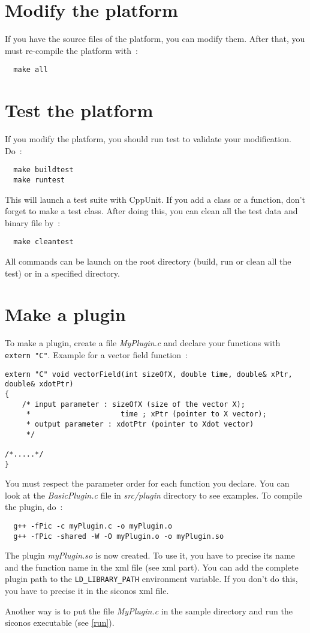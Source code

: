 \section{Modify the platform}
If you have the source files of the platform, you can modify them.
After that, you must re-compile the platform with~:
\begin{verbatim}
  make all
\end{verbatim}

\section{Test the platform} 
If you modify the platform, you should run test to validate your modification. Do~:
\begin{verbatim}
  make buildtest
  make runtest
\end{verbatim}

This will launch a test suite with CppUnit.
If you add a class or a function, don't forget to make a test class.
After doing this, you can clean all the test data and binary file by~:
\begin{verbatim}
  make cleantest
\end{verbatim}

All commands can be launch on the root directory (build, run or clean all the test) or in a specified directory.

\section{Make a plugin}\label{plugin}

To make a plugin, create a file \textit{MyPlugin.c} and declare your functions with \verb+extern "C"+. Example for a vector field function~:
\begin{verbatim}
extern "C" void vectorField(int sizeOfX, double time, double& xPtr, double& xdotPtr)
{
    /* input parameter : sizeOfX (size of the vector X); 
     *                     time ; xPtr (pointer to X vector); 
     * output parameter : xdotPtr (pointer to Xdot vector)
     */

/*.....*/
}
\end{verbatim}
You must respect the parameter order for each function you declare. You can look at the \textit{BasicPlugin.c} file in \textit{src/plugin} directory to see examples.
To compile the plugin, do~:
\begin{verbatim}
  g++ -fPic -c myPlugin.c -o myPlugin.o
  g++ -fPic -shared -W -O myPlugin.o -o myPlugin.so
\end{verbatim}
The plugin \textit{myPlugin.so} is now created.
To use it, you have to precise its name and the function name in the \ac{xml} file (see xml part).
You can add the complete plugin path to the \verb+LD_LIBRARY_PATH+ environment variable. If you don't do this, you have to precise it in the \ac{siconos} \ac{xml} file.

Another way is to put the file \textit{MyPlugin.c} in the sample directory and run the siconos executable (see \ref{run}).
